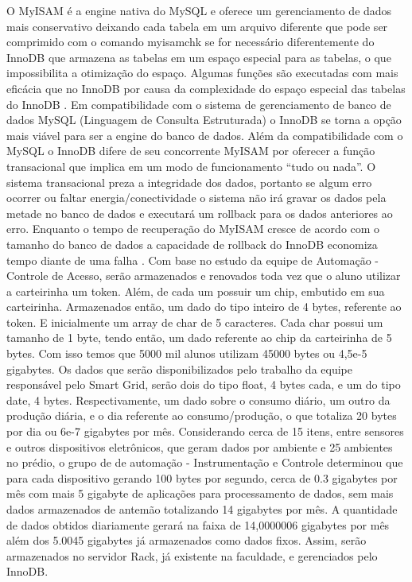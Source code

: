 O MyISAM é a engine nativa do MySQL e oferece um gerenciamento de dados mais conservativo deixando cada tabela em um arquivo diferente que pode ser comprimido com o comando myisamchk se for necessário diferentemente do InnoDB que armazena as tabelas em um espaço especial para as tabelas, o que impossibilita a otimização do espaço. Algumas funções são executadas com mais eficácia que no InnoDB por causa da complexidade do espaço especial das tabelas do InnoDB \cite{InnoDB}.
Em compatibilidade com o sistema de gerenciamento de banco de dados MySQL (Linguagem de Consulta Estruturada) o InnoDB se torna a opção mais viável para ser a engine do banco de dados. Além da compatibilidade com o MySQL o InnoDB difere de seu concorrente MyISAM por oferecer a função transacional que implica em um modo de funcionamento “tudo ou nada”. O sistema transacional preza a integridade dos dados, portanto se algum erro ocorrer ou faltar energia/conectividade o sistema não irá gravar os dados pela metade no banco de dados e executará um rollback para os dados anteriores ao erro. Enquanto o tempo de recuperação do MyISAM cresce de acordo com o tamanho do banco de dados a capacidade de rollback do InnoDB economiza tempo diante de uma falha \cite{InnoDB}.
Com base no estudo da equipe de Automação - Controle de Acesso, serão armazenados e renovados toda vez que o aluno utilizar a carteirinha um token. Além, de cada um possuir um chip, embutido em sua carteirinha. Armazenados então, um dado do tipo inteiro de 4 bytes\cite{microsoft1}, referente ao token. E inicialmente um array de char de 5 caracteres. Cada char possui um tamanho de 1 byte\cite{microsoft1}, tendo então, um dado referente ao chip da carteirinha de 5 bytes. Com isso temos que 5000 mil alunos utilizam 45000 bytes ou 4,5e-5 gigabytes.
Os dados que serão disponibilizados pelo trabalho da equipe responsável pelo Smart Grid, serão dois do tipo float, 4 bytes\cite{microsoft1} cada, e um do tipo date, 4 bytes\cite{microsoft1}. Respectivamente, um dado sobre o consumo diário, um outro da produção diária, e o dia referente ao consumo/produção, o que totaliza 20 bytes por dia ou 6e-7 gigabytes por mês.
Considerando cerca de 15 itens, entre sensores e outros dispositivos eletrônicos,  que geram dados por ambiente e 25 ambientes no prédio, o grupo de de automação - Instrumentação e Controle determinou que para cada dispositivo gerando 100 bytes por segundo, cerca de 0.3 gigabytes por mês com mais 5 gigabyte de aplicações para processamento de dados, sem mais dados armazenados de antemão totalizando 14 gigabytes por mês.
A quantidade de dados obtidos diariamente gerará na faixa de 14,0000006 gigabytes por mês além dos 5.0045 gigabytes já armazenados como dados fixos. Assim, serão armazenados no servidor Rack, já existente na faculdade, e gerenciados pelo InnoDB.

